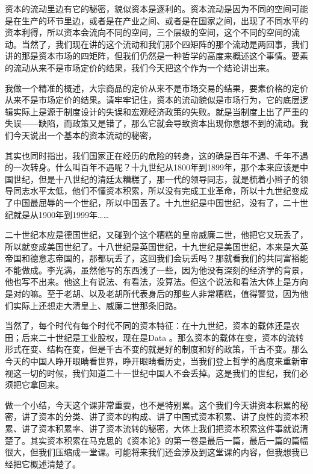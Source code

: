 \documentclass[UTF8, 12pt, a4paper]{ctexrep}
\begin{document}
资本的流动里边有它的秘密，貌似资本是逐利的。资本流动是因为不同的空间可能是在生产的环节里边，或者是在产业之间、或者是在国家之间，出现了不同水平的资本利得，所以资本会流向不同的空间，三个层级的空间，这个不同的空间的流动。当然了，我们现在讲的这个流动和我们那个四矩阵的那个流动是两回事，我们讲的那是资本市场的四矩阵，但我们仍然是一种哲学的高度来概述这个事情。要素的流动从来不是市场定价的结果，我们今天把这个作为一个结论讲出来。

我做一个精准的概述，大宗商品的定价从来不是市场交易的结果，要素价格的定价从来不是市场定价的结果。请牢牢记住，资本的流动貌似是市场行为，它的底层逻辑实际上是源于制度设计的失误和宏观经济政策的失败。就是当制度上出了严重的失误——缺陷，而政策又是错了，那么它就会导致资本出现你意想不到的流动。我们今天说出一个基本的资本流动的秘密，

其实也同时指出，我们国家正在经历的危险的转身，这的确是百年不遇、千年不遇的一次转身。什么叫百年不遇呢？十九世纪从1800年到1899年，那个本来应该是中国世纪，但是十八世纪的清廷太糟糕了，那一代的领导同志，就是梳着小辫子的领导同志水平太低，他们不懂资本积累，所以没有完成工业革命，所以十九世纪变成了中国最屈辱的一个世纪，所以中国丢了。十九世纪是中国世纪，没有了，二十世纪就是从1900年到1999年……

二十世纪本应是德国世纪，又碰到个这个糟糕的皇帝威廉二世，他把它又玩丢了，所以就变成美国世纪了。十八世纪是英国世纪，十九世纪是美国世纪，本来是大英帝国和德意志帝国的，那都玩丢了，这回我们会玩丢吗？那就看我们的共同富裕能不能做成。李光满，虽然他写的东西浅了一些，因为他没有深刻的经济学的背景，他也写不出来。他这上有说法、有看法，没算法。但这个说法和看法大体上是方向是对的嘛。至于老胡、以及老胡所代表身后的那些人非常糟糕，值得警觉，因为他们实际上还想走大清皇上、威廉二世那条旧路。

当然了，每个时代有每个时代不同的资本特征：在十九世纪，资本的载体还是农田；后来二十世纪是工业股权，现在是Data 。那么资本的载体在变，资本的流转形式在变、结构在变，但是千古不变的就是好的制度和好的政策，千古不变。那么今天的中国人睁开眼睛看世界，睁开眼睛看历史，当我们登上哲学的高度来重新审视这一切的时候，我们知道二十一世纪中国人不会丢掉。这是我们的世纪，我们必须把它拿回来。

做一个小结，今天这个课非常重要，也不是特别累。这个我们今天讲资本积累的秘密，讲了资本的分类、讲了资本的构成、讲了中国式资本积累、讲了良性的资本积累、讲了资本积累率、讲了资本流转的秘密，大体上我们把资本积累这件事就说清楚了。其实资本积累在马克思的《资本论》的第一卷是最后一篇，最后一篇的篇幅很大，但我们压缩成一堂课。可能将来我们还会涉及到这堂课的内容，但我想我已经把它概述清楚了。
\end{document}
